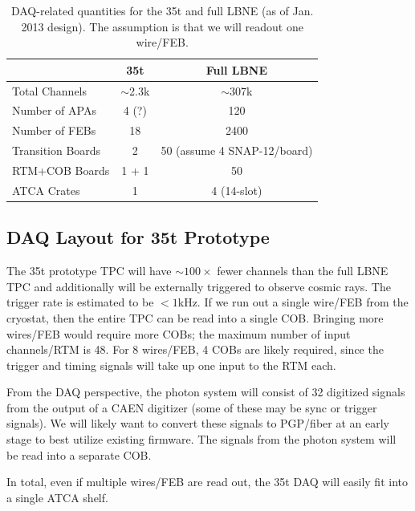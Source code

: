 \begin{table}[tbh]
\begin{center}
\begin{tabular}{|l|c|c|}   
\hline \hline 
    & 35t  & Full LBNE \\      
\hline
   Total Channels        & $\sim$2.3k &$\sim$307k \\ 
	Number of APAs     &  4 (?)     &    120        \\ 
   Number of FEBs       & 18 & 2400 \\ 
   Transition Boards    & 2   & 50 (assume 4 SNAP-12/board) \\ 
   RTM+COB Boards    & 1 + 1 &  50  \\
   ATCA Crates            & 1   &  4 (14-slot)   \\ 
\hline \hline
\end{tabular}
\caption[]{DAQ-related quantities for the 35t and full LBNE (as of Jan. 2013 design).  The assumption is that we will readout one wire/FEB.}
\label{tab:daqsumm} 
\end{center}
\end{table}





\subsection{DAQ Layout for 35t Prototype}

The 35t prototype TPC will have $\sim 100\times$ fewer channels than the full LBNE TPC and additionally will be externally triggered to observe cosmic rays.  The trigger rate is estimated to be  $<1$kHz.  If we run out a single wire/FEB from the cryostat, then the entire TPC can be read into a single COB.  
Bringing more wires/FEB would require more COBs; the maximum number of input channels/RTM is 48.  For 8 wires/FEB, 4 COBs are likely required, since the trigger and timing signals will take up one input to the RTM each.  

From the DAQ perspective, the photon system will consist of 32 digitized signals from the output of a CAEN digitizer (some of these may be sync or trigger signals).  We will likely want to convert these signals to PGP/fiber at an early stage to best utilize existing firmware.  The signals from the photon system will be read into a separate COB.  

In total, even if multiple wires/FEB are read out, the 35t DAQ will easily fit into a single ATCA shelf.  


